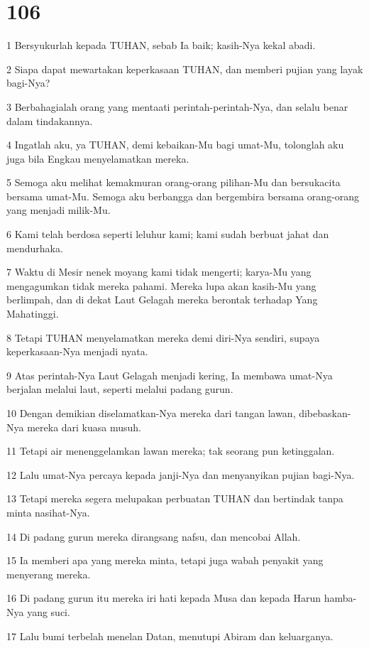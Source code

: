 \chapter{106}

\par 1 Bersyukurlah kepada TUHAN, sebab Ia baik; kasih-Nya kekal abadi.
\par 2 Siapa dapat mewartakan keperkasaan TUHAN, dan memberi pujian yang layak bagi-Nya?
\par 3 Berbahagialah orang yang mentaati perintah-perintah-Nya, dan selalu benar dalam tindakannya.
\par 4 Ingatlah aku, ya TUHAN, demi kebaikan-Mu bagi umat-Mu, tolonglah aku juga bila Engkau menyelamatkan mereka.
\par 5 Semoga aku melihat kemakmuran orang-orang pilihan-Mu dan bersukacita bersama umat-Mu. Semoga aku berbangga dan bergembira bersama orang-orang yang menjadi milik-Mu.
\par 6 Kami telah berdosa seperti leluhur kami; kami sudah berbuat jahat dan mendurhaka.
\par 7 Waktu di Mesir nenek moyang kami tidak mengerti; karya-Mu yang mengagumkan tidak mereka pahami. Mereka lupa akan kasih-Mu yang berlimpah, dan di dekat Laut Gelagah mereka berontak terhadap Yang Mahatinggi.
\par 8 Tetapi TUHAN menyelamatkan mereka demi diri-Nya sendiri, supaya keperkasaan-Nya menjadi nyata.
\par 9 Atas perintah-Nya Laut Gelagah menjadi kering, Ia membawa umat-Nya berjalan melalui laut, seperti melalui padang gurun.
\par 10 Dengan demikian diselamatkan-Nya mereka dari tangan lawan, dibebaskan-Nya mereka dari kuasa musuh.
\par 11 Tetapi air menenggelamkan lawan mereka; tak seorang pun ketinggalan.
\par 12 Lalu umat-Nya percaya kepada janji-Nya dan menyanyikan pujian bagi-Nya.
\par 13 Tetapi mereka segera melupakan perbuatan TUHAN dan bertindak tanpa minta nasihat-Nya.
\par 14 Di padang gurun mereka dirangsang nafsu, dan mencobai Allah.
\par 15 Ia memberi apa yang mereka minta, tetapi juga wabah penyakit yang menyerang mereka.
\par 16 Di padang gurun itu mereka iri hati kepada Musa dan kepada Harun hamba-Nya yang suci.
\par 17 Lalu bumi terbelah menelan Datan, menutupi Abiram dan keluarganya.
